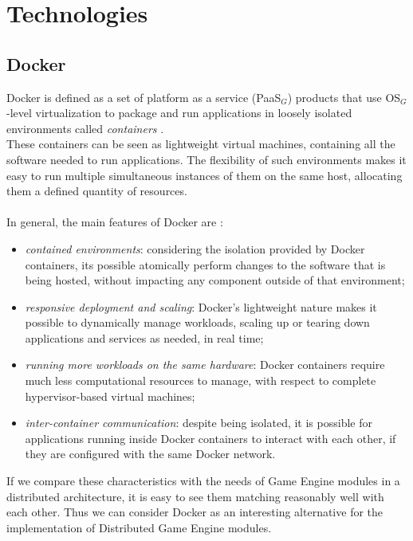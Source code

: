 
\chapter{Technologies}
\label{cap:technologies}

\section{Docker}
Docker is defined as a set of platform as a service (PaaS$_G$) products that use OS$_G$-level virtualization to package and run applications in loosely isolated environments called \textit{containers} \cite{site:docker-wiki}. \\
These containers can be seen as lightweight virtual machines, containing all the software needed to run applications. The flexibility of such environments makes it easy to run multiple simultaneous instances of them on the same host, allocating them a defined quantity of resources. \\ \\
In general, the main features of Docker are \cite{site:docker-website}:
\begin{itemize}
	\item \textit{contained environments}: considering the isolation provided by Docker containers, its possible atomically perform changes to the software that is being hosted, without impacting any component outside of that environment;
	\item \textit{responsive deployment and scaling}: Docker's lightweight nature makes it possible to dynamically manage workloads, scaling up or tearing down applications and services as needed, in real time;
	\item \textit{running more workloads on the same hardware}: Docker containers require much less computational resources to manage, with respect to complete hypervisor-based virtual machines;
	\item \textit{inter-container communication}: despite being isolated, it is possible for applications running inside Docker containers to interact with each other, if they are configured with the same Docker network.
\end{itemize}
If we compare these characteristics with the needs of Game Engine modules in a distributed architecture, it is easy to see them matching reasonably well with each other. Thus we can consider Docker as an interesting alternative for the implementation of Distributed Game Engine modules.


